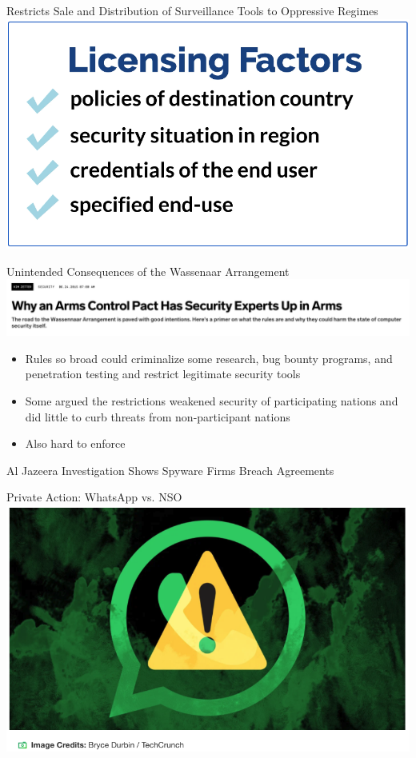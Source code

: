 \documentclass[nobackground,dvipsnames,table]{beamer}
\begin{document}
\begin{frame}{Restricts Sale and Distribution of Surveillance Tools to Oppressive Regimes}
    \includegraphics[width=\textwidth]{wassenaar-licensing-factors}
\end{frame}

\begin{frame}{Unintended Consequences of the Wassenaar Arrangement}
    \includegraphics[width=\textwidth]{wired-arms-control}
    \begin{itemize}
        \item Rules so broad could criminalize some research, bug bounty programs, and penetration testing and restrict legitimate security tools 
        \item Some argued the restrictions weakened security of participating nations and did little to curb threats from non-participant nations
        \item Also hard to enforce 
    \end{itemize}
\end{frame}

\begin{frame}{Al Jazeera Investigation Shows Spyware Firms Breach Agreements}
\end{frame}

\begin{frame}{Private Action: WhatsApp vs. NSO }
    \includegraphics[width=\textwidth]{nso-whatsapp}
\end{frame}
\end{document}
